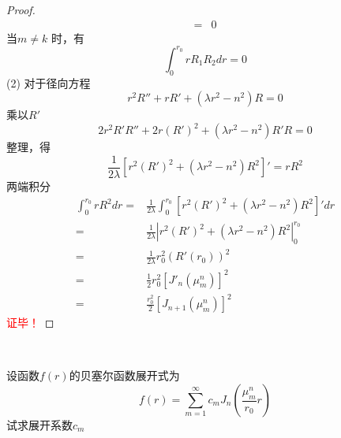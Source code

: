 \begin{proof}
\begin{equation*}
\begin{split}
			=& 0
		\end{split}
	\end{equation*}	
	当$ m \ne k $ 时，有
	\begin{equation*}	
		\int_0 ^{r_0} r R_{1} R_{2} dr = 0
	\end{equation*}
	(2) 对于径向方程
	\begin{equation*}
		r^2 R''+r R' +(\lambda r^2 -n^2)R=0 
	\end{equation*}	
	乘以$R'$
	\begin{equation*}
		2r^2 R'R''+2r (R')^2 +(\lambda r^2 -n^2)R'R=0 
	\end{equation*}	
	整理，得
	\begin{equation*}
		\frac{1}{2 \lambda}[r^2 (R')^2 + (\lambda r^2 -n^2)R^2]'= rR^2
	\end{equation*}
	两端积分
	\begin{equation*}
		\begin{split}
			\int_0 ^{r_0} r R^2 dr =& \frac{1}{2\lambda} \int_0 ^{r_0} [r^2 (R')^2 + (\lambda r^2 -n^2)R^2]' dr  \\
			=& \frac{1}{2\lambda} |r^2 (R')^2 + (\lambda r^2 -n^2)R^2 |_0 ^{r_0} \\
			=& \frac{1}{2\lambda} r_0^2 (R'(r_0))^2 \\
			=& \frac{1}{2} r_0^2 [J'_n(\mu_m ^n)]^2 \\
			=& \frac{r_0^2}{2} [J_{n+1}(\mu_m ^n)]^2
		\end{split}
	\end{equation*}
\textcolor{red}{证毕！}
\end{proof}
~~\\ 

\begin{example}
设函数$f(r)$的贝塞尔函数展开式为
	\begin{equation*}
		f(r)=\sum_{m=1}^\infty c_m J_n(\frac{\mu_m ^n}{r_0} r)
	\end{equation*}	
	试求展开系数$c_m$	
\end{example}
 
